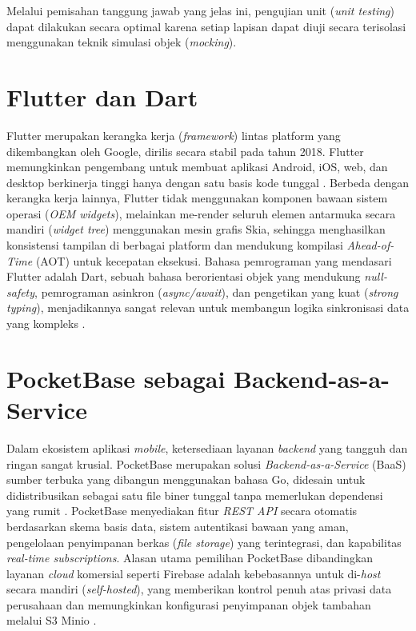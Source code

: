 Melalui pemisahan tanggung jawab yang jelas ini, pengujian unit (\textit{unit testing}) dapat dilakukan secara optimal karena setiap lapisan dapat diuji secara terisolasi menggunakan teknik simulasi objek (\textit{mocking}).

\section{Flutter dan Dart}
Flutter merupakan kerangka kerja (\textit{framework}) lintas platform yang dikembangkan oleh Google, dirilis secara stabil pada tahun 2018. Flutter memungkinkan pengembang untuk membuat aplikasi Android, iOS, web, dan desktop berkinerja tinggi hanya dengan satu basis kode tunggal \cite{flutter_docs}. Berbeda dengan kerangka kerja lainnya, Flutter tidak menggunakan komponen bawaan sistem operasi (\textit{OEM widgets}), melainkan me-render seluruh elemen antarmuka secara mandiri (\textit{widget tree}) menggunakan mesin grafis Skia, sehingga menghasilkan konsistensi tampilan di berbagai platform dan mendukung kompilasi \textit{Ahead-of-Time} (AOT) untuk kecepatan eksekusi. Bahasa pemrograman yang mendasari Flutter adalah Dart, sebuah bahasa berorientasi objek yang mendukung \textit{null-safety}, pemrograman asinkron (\textit{async/await}), dan pengetikan yang kuat (\textit{strong typing}), menjadikannya sangat relevan untuk membangun logika sinkronisasi data yang kompleks \cite{flutter_docs}.

\section{PocketBase sebagai Backend-as-a-Service}
Dalam ekosistem aplikasi \textit{mobile}, ketersediaan layanan \textit{backend} yang tangguh dan ringan sangat krusial. PocketBase merupakan solusi \textit{Backend-as-a-Service} (BaaS) sumber terbuka yang dibangun menggunakan bahasa Go, didesain untuk didistribusikan sebagai satu file biner tunggal tanpa memerlukan dependensi yang rumit \cite{pocketbase_docs}. PocketBase menyediakan fitur \textit{REST API} secara otomatis berdasarkan skema basis data, sistem autentikasi bawaan yang aman, pengelolaan penyimpanan berkas (\textit{file storage}) yang terintegrasi, dan kapabilitas \textit{real-time subscriptions}. Alasan utama pemilihan PocketBase dibandingkan layanan \textit{cloud} komersial seperti Firebase adalah kebebasannya untuk di-\textit{host} secara mandiri (\textit{self-hosted}), yang memberikan kontrol penuh atas privasi data perusahaan dan memungkinkan konfigurasi penyimpanan objek tambahan melalui S3 Minio \cite{pocketbase_docs}.

